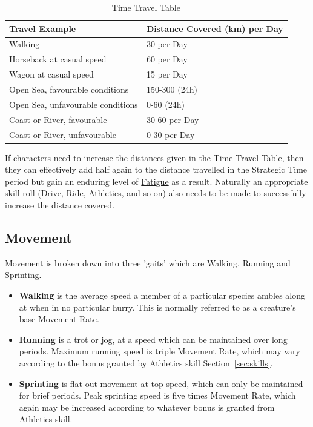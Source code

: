 \documentclass[10pt]{article}
\newcommand{\secref}[1]{Section~\ref{#1}}
\begin{document}
\begin{table}[h]
\centering
\caption{Time Travel Table}
\label{tab:strategic-travel}
\begin{tabular}{ll}
\toprule
\textbf{Travel Example} & \textbf{Distance Covered (km) per Day} \\
\midrule
Walking & 30 per Day \\
Horseback at casual speed & 60 per Day \\
Wagon at casual speed & 15 per Day \\
Open Sea, favourable conditions & 150-300 (24h) \\
Open Sea, unfavourable conditions & 0-60 (24h) \\
Coast or River, favourable & 30-60 per Day \\
Coast or River, unfavourable & 0-30 per Day \\
\bottomrule
\end{tabular}
\end{table}

If characters need to increase the distances given in the Time Travel Table, then they can effectively add half again to the distance travelled in the Strategic Time period but gain an enduring level of 
\hyperref[sec:fatigue]{Fatigue} as a result. Naturally an appropriate skill roll (Drive, Ride, Athletics, and so on) also needs to be made to successfully increase the distance covered.


\subsection{Movement}
\label{sec:movement}
Movement is broken down into three 'gaits' which are Walking, Running and Sprinting.
\begin{itemize}[leftmargin=*]
    \item \textbf{Walking} is the average speed a member of a particular species ambles along at when in no particular hurry. This is normally referred to as a creature's base Movement Rate.
    \item \textbf{Running} is a trot or jog, at a speed which can be maintained over long periods. Maximum running speed is triple Movement Rate, which may vary according to the bonus granted by Athletics skill \secref{sec:skills}.
    \item \textbf{Sprinting} is flat out movement at top speed, which can only be maintained for brief periods. Peak sprinting speed is five times Movement Rate, which again may be increased according to whatever bonus is granted from Athletics skill.
\end{itemize}
\end{document}
